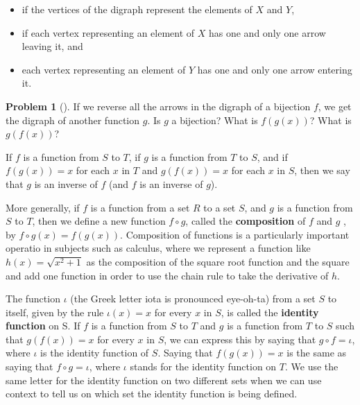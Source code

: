 \documentclass[10pt,]{book}
\newcommand{\terminology}[1]{\textbf{#1}}
\theoremstyle{plain}
\theoremstyle{definition}
\newtheorem{activity}[project]{Problem}
\theoremstyle{definition}
\numberwithin{equation}{chapter}
\begin{document}
\begin{itemize}[label=\textbullet]
\item{}\hypertarget{p-1903}{}%
if the vertices of the digraph represent the elements of \(X\) and \(Y\),%
\item{}\hypertarget{p-1904}{}%
if each vertex representing an element of \(X\) has one and only one arrow leaving it, and%
\item{}\hypertarget{p-1905}{}%
each vertex representing an element of \(Y\) has one and only one arrow entering it.%
\end{itemize}
%
\begin{activity}[]\marginsymbol[-1em]{} \label{activity-338}
\hypertarget{p-1906}{}%
If we reverse all the arrows in the digraph of a bijection \(f\), we get the digraph of another function \(g\). Is \(g\) a bijection? What is \(f(g(x))\)? What is \(g(f(x))\)?%
\end{activity}
\hypertarget{p-1908}{}%
If \(f\) is a function from \(S\) to \(T\), if \(g\) is a function from \(T\) to \(S\), and if \(f(g(x))= x\) for each \(x\) in \(T\) and \(g(f(x)) = x\) for each \(x\) in \(S\), then we say that \(g\) is an inverse of \(f\) (and \(f\) is an inverse of \(g\)).%
\par
\hypertarget{p-1909}{}%
More generally, if \(f\) is a function from a set \(R\) to a set \(S\), and \(g\) is a function from \(S\) to \(T\), then we define a new function \(f \circ g\), called the \terminology{composition} of \(f\) and \(g\) , by \(f\circ g(x) = f(g(x))\).  Composition of functions is a particularly important operatio in subjects such as calculus, where we represent a function like \(h(x) = \sqrt{x^2 + 1}\) as the composition of the square root function and the square and add one function in order to use the chain rule to take the derivative of \(h\).%
\par
\hypertarget{p-1910}{}%
The function \(\iota\) (the Greek letter iota is pronounced eye-oh-ta) from a set \(S\) to itself, given by the rule \(\iota(x) = x\) for every \(x\) in \(S\), is called the \terminology{identity function} on S.  If \(f\) is a function from \(S\) to \(T\) and \(g\) is a function from \(T\) to \(S\) such that \(g(f(x)) = x\) for every \(x\) in \(S\), we can express this by saying that \(g\circ f = \iota\), where \(\iota\) is the identity function of \(S\). Saying that \(f(g(x)) = x\) is the same as saying that \(f\circ g = \iota\), where \(\iota\) stands for the identity function on \(T\).  We use the same letter for the identity function on two different sets when we can use context to tell us on which set the identity function is being defined.%
\end{document}
